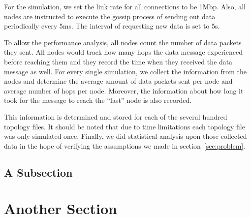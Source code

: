 For the simulation, we set the link rate for all connections to be 1Mbp. Also, all nodes are instructed to execute the gossip process of sending out data periodically every 5ms. The interval of requesting new data is set to 5s.

To allow the performance analysis, all nodes count the number of data packets they sent. All nodes would track how many hops the data message experienced before reaching them and they record the time when they received the data message as well. For every single simulation, we collect the information from the nodes and determine the average amount of data packets sent per node and average number of hops per node. Moreover, the information about how long it took for the message to reach the ``last'' node is also recorded.

This information is determined and stored for each of the several hundred topology files. It should be noted that due to time limitations each topology file was only simulated once. Finally, we did statistical analysis upon those collected data in the hope of verifying the assumptions we made in section~\ref{sec:problem}.


\subsection{A Subsection}


\section{Another Section}

